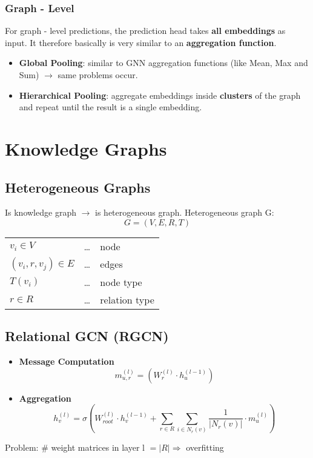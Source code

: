 \documentclass[parskip=full]{scrartcl}
\begin{document}
\subsubsection{Graph - Level}
For graph - level predictions, the prediction head takes \textbf{all embeddings} as input. It therefore basically is very similar to an \textbf{aggregation function}. \newline
\begin{itemize}
	\item \textbf{Global Pooling}: similar to GNN aggregation functions (like Mean, Max and Sum) $\rightarrow$ same problems occur.
	\item \textbf{Hierarchical Pooling}: aggregate embeddings inside \textbf{clusters} of the graph and repeat until the result is a single embedding.
\end{itemize}


\section{Knowledge Graphs}

\subsection{Heterogeneous Graphs}
Is knowledge graph $\rightarrow$ is heterogeneous graph.
Heterogeneous graph G:
\[G = (V, E, R, T)\]
\begin{center}
\begin{tabular}{l c l}
	$v_i \in V$ & \dots & node \\
	$(v_i, r, v_j) \in E$ & \dots & edges \\
	$T(v_i)$ & \dots & node type \\
	$r \in R$ & \dots & relation type
\end{tabular}
\end{center}

\subsection{Relational GCN (RGCN) \cite{schlichtkrull2017modeling}}

\begin{itemize}
	\item[] \textbf{Message Computation}\newline
		\[m_{u,r}^{(l)} = \left(W_r^{(l)} \cdot h_u^{(l-1)}\right)\]
	\item[] \textbf{Aggregation}\newline
		\[h_v^{(l)} = \sigma \left(W_{root}^{(l)} \cdot h_v^{(l-1)} + \sum_{r \in R} \sum_{i \in N_r(v)} \frac{1}{\vert N_r(v) \vert} \cdot m_u^{(l)} \right)\]
\end{itemize}
Problem: \# weight matrices in layer l $= \vert R \vert \Rightarrow$ overfitting
\end{document}
